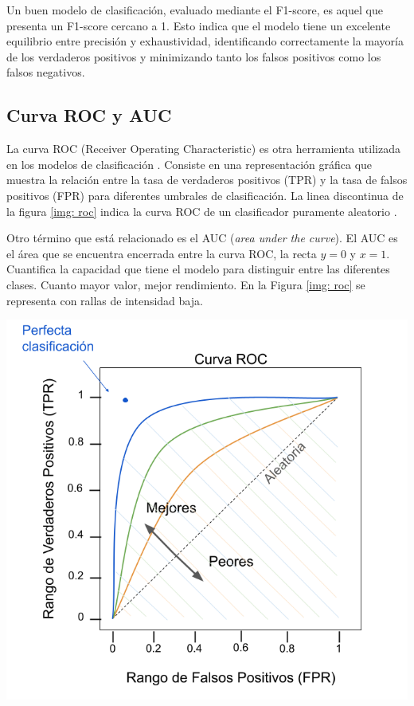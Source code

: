 Un buen modelo de clasificación, evaluado mediante el F1-score, es aquel que presenta un F1-score cercano a 1. Esto indica que el modelo tiene un excelente equilibrio entre precisión y exhaustividad, identificando correctamente la mayoría de los verdaderos positivos y minimizando tanto los falsos positivos como los falsos negativos. 

\subsection{Curva ROC y AUC}

\begin{minipage}{0.5\textwidth}
La curva ROC (Receiver Operating Characteristic) es otra herramienta utilizada en los modelos de clasificación \citep{geron2022hands}. Consiste en una representación gráfica que muestra la relación entre la tasa de verdaderos positivos (TPR) y la tasa de falsos positivos (FPR) para diferentes umbrales de clasificación. La linea discontinua de la figura \ref{img: roc} indica la curva ROC de un clasificador puramente aleatorio \citep{geron2022hands}. 

\bigskip

Otro término que está relacionado es el AUC (\textit{area under the curve}). El AUC es el área que se encuentra encerrada entre la curva ROC, la recta $y = 0$ y $x = 1$. Cuantifica la capacidad que tiene el modelo para distinguir entre las diferentes clases. Cuanto mayor valor, mejor rendimiento. En la Figura \ref{img: roc} se representa con rallas de intensidad baja. 
\end{minipage}
\begin{minipage}{0.05\textwidth}
\textbf{ }
\end{minipage}
\begin{minipage}{0.4\textwidth}
	\includegraphics[width=1.15\textwidth]{img/roc.png}
	\label{img: roc}
\end{minipage}

